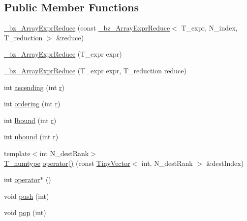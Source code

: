 \subsection*{Public Member Functions}
\begin{DoxyCompactItemize}
\item 
\hyperlink{class__bz__ArrayExprReduce_abd09be233f6db920728b720bd2ef0531}{\+\_\+bz\+\_\+\+Array\+Expr\+Reduce} (const \hyperlink{class__bz__ArrayExprReduce}{\+\_\+bz\+\_\+\+Array\+Expr\+Reduce}$<$ T\+\_\+expr, N\+\_\+index, T\+\_\+reduction $>$ \&reduce)
\item 
\hyperlink{class__bz__ArrayExprReduce_a74192bc9909820f2a9a6678e4f97c116}{\+\_\+bz\+\_\+\+Array\+Expr\+Reduce} (T\+\_\+expr expr)
\item 
\hyperlink{class__bz__ArrayExprReduce_a0f1caa7dce34bc720bc493c6462addef}{\+\_\+bz\+\_\+\+Array\+Expr\+Reduce} (T\+\_\+expr expr, T\+\_\+reduction reduce)
\item 
int \hyperlink{class__bz__ArrayExprReduce_a67ae750a99bde84eafebf3c238fb1d11}{ascending} (int \hyperlink{indexexpr_8h_ac434fd11cc2493608d8d91424d60c17e}{r})
\item 
int \hyperlink{class__bz__ArrayExprReduce_a77736f9950376d43f220430431658c25}{ordering} (int \hyperlink{indexexpr_8h_ac434fd11cc2493608d8d91424d60c17e}{r})
\item 
int \hyperlink{class__bz__ArrayExprReduce_a49be3acd517f3c8be2a9233ba53ab06d}{lbound} (int \hyperlink{indexexpr_8h_ac434fd11cc2493608d8d91424d60c17e}{r})
\item 
int \hyperlink{class__bz__ArrayExprReduce_a6d93839daa5a7e0ea7053d9a4992553d}{ubound} (int \hyperlink{indexexpr_8h_ac434fd11cc2493608d8d91424d60c17e}{r})
\item 
{\footnotesize template$<$int N\+\_\+dest\+Rank$>$ }\\\hyperlink{class__bz__ArrayExprReduce_a3ddc92b95f8b98391d5e09769317f1dc}{T\+\_\+numtype} \hyperlink{class__bz__ArrayExprReduce_a65d565fffcec571764fe5455399b272d}{operator()} (const \hyperlink{classTinyVector}{Tiny\+Vector}$<$ int, N\+\_\+dest\+Rank $>$ \&dest\+Index)
\item 
int \hyperlink{class__bz__ArrayExprReduce_a1d0cd7027f5945d1560ce9871714f0a2}{operator$\ast$} ()
\item 
void \hyperlink{class__bz__ArrayExprReduce_aa8cd6dfa0c31a691838c9de15f000358}{push} (int)
\item 
void \hyperlink{class__bz__ArrayExprReduce_a77f6f9913a9f6331427924c47902ae5b}{pop} (int)
\item 

\end{DoxyCompactItemize}
